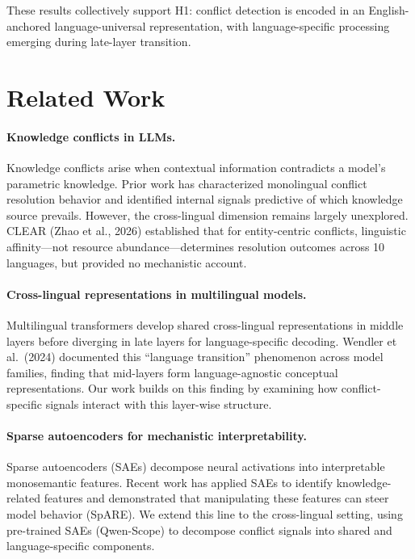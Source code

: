 \documentclass{article}
\begin{document}
These results collectively support H1: conflict detection is encoded in an English-anchored language-universal representation, with language-specific processing emerging during late-layer transition.

\section{Related Work}

\paragraph{Knowledge conflicts in LLMs.}
Knowledge conflicts arise when contextual information contradicts a model's parametric knowledge. Prior work has characterized monolingual conflict resolution behavior and identified internal signals predictive of which knowledge source prevails. However, the cross-lingual dimension remains largely unexplored. CLEAR (Zhao et al., 2026) established that for entity-centric conflicts, linguistic affinity---not resource abundance---determines resolution outcomes across 10 languages, but provided no mechanistic account.

\paragraph{Cross-lingual representations in multilingual models.}
Multilingual transformers develop shared cross-lingual representations in middle layers before diverging in late layers for language-specific decoding. Wendler et al.\ (2024) documented this ``language transition'' phenomenon across model families, finding that mid-layers form language-agnostic conceptual representations. Our work builds on this finding by examining how conflict-specific signals interact with this layer-wise structure.

\paragraph{Sparse autoencoders for mechanistic interpretability.}
Sparse autoencoders (SAEs) decompose neural activations into interpretable monosemantic features. Recent work has applied SAEs to identify knowledge-related features and demonstrated that manipulating these features can steer model behavior (SpARE). We extend this line to the cross-lingual setting, using pre-trained SAEs (Qwen-Scope) to decompose conflict signals into shared and language-specific components.
\end{document}
